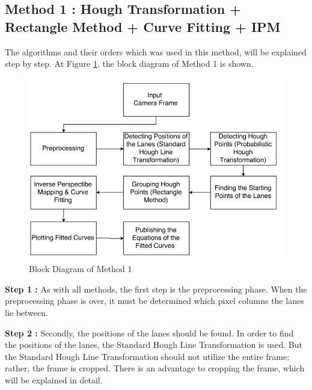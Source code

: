 %
\subsection{Method 1 : Hough Transformation + Rectangle Method + Curve Fitting + IPM}\label{sec:Case 1}

The algorithms and their orders which was used in this method, will be explained step by step. At Figure \ref{fig:Case1_BlockDiagram}, the block diagram of Method 1 is shown.



\begin{figure}[H]
 \centering
  \includegraphics[width=1\textwidth]{./Bilder/Case1_BlockDiagram.png}		 \caption{Block Diagram of Method 1}
  \label{fig:Case1_BlockDiagram}
\end{figure}



\textbf{Step 1 : }As with all methods, the first step is the preprocessing phase. When the preprocessing phase is over, it must be determined which pixel columns the lanes lie between. 

\textbf{Step 2 : }Secondly, the positions of the lanes should be found. In order to find the positions of the lanes, the Standard Hough Line Transformation is used. But the Standard Hough Line Transformation should not utilize the entire frame; rather, the frame is cropped. There is an advantage to cropping the frame, which will be explained in detail.


